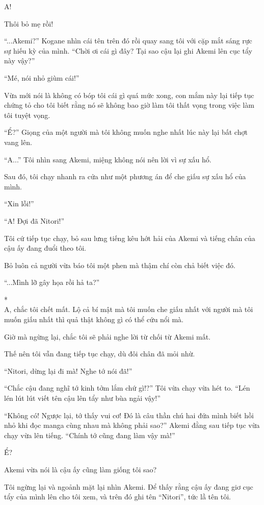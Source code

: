 {A!

Thôi bỏ mẹ rồi!

``...Akemi?'' Kogane nhìn cái tên trên đó rồi quay sang tôi với cặp mắt
sáng rực sự hiếu kỳ của mình. ``Chời ơi cái gì đây? Tại sao cậu lại ghi
Akemi lên cục tẩy này vậy?''

``Mé, nói nhỏ giùm cái!''

Vừa mới nói là không có bóp tôi cái gì quá mức xong, con mắm này lại
tiếp tục chứng tỏ cho tôi biết rằng nó sẽ không bao giờ làm tôi thất
vọng trong việc làm tôi tuyệt vọng.

``Ể?'' Giọng của một người mà tôi không muốn nghe nhất lúc này lại bất
chợt vang lên.

``A...'' Tôi nhìn sang Akemi, miệng không nói nên lời vì sự xấu hổ.

Sau đó, tôi chạy nhanh ra cửa như một phương án để che giấu sự xấu hổ
của mình.

``Xin lỗi!''

``A! Đợi đã Nitori!''

Tôi cứ tiếp tục chạy, bỏ sau lưng tiếng kêu hớt hải của Akemi và tiếng
chân của cậu ấy đang đuổi theo tôi.

Bỏ luôn cả người vừa báo tôi một phen mà thậm chí còn chả biết việc đó.

``...Mình lỡ gây họa rồi hả ta?''

*\\
A, chắc tôi chết mất. Lộ cả bí mật mà tôi muốn che giấu nhất với người
mà tôi muốn giấu nhất thì quả thật không gì có thể cứu nổi mà.

Giờ mà ngừng lại, chắc tôi sẽ phải nghe lời từ chối từ Akemi mất.

Thế nên tôi vẫn đang tiếp tục chạy, dù đôi chân đã mỏi nhừ.

``Nitori, dừng lại đi mà! Nghe tớ nói đã!''

``Chắc cậu đang nghĩ tớ kinh tởm lắm chứ gì!?'' Tôi vừa chạy vừa hét to.
``Lén lén lút lút viết tên cậu lên tẩy như bùa ngải vậy!''

``Không có! Ngược lại, tớ thấy vui cơ! Đó là câu thần chú hai đứa mình
biết hồi nhỏ khi đọc manga cùng nhau mà không phải sao?'' Akemi đằng sau
tiếp tục vừa chạy vừa lên tiếng. ``Chính tớ cũng đang làm vậy mà!''

Ể?

Akemi vừa nói là cậu ấy cũng làm giống tôi sao?

Tôi ngừng lại và ngoảnh mặt lại nhìn Akemi. Để thấy rằng cậu ấy đang giơ
cục tẩy của mình lên cho tôi xem, và trên đó ghi tên ``Nitori'', tức lầ
tên tôi.

}
